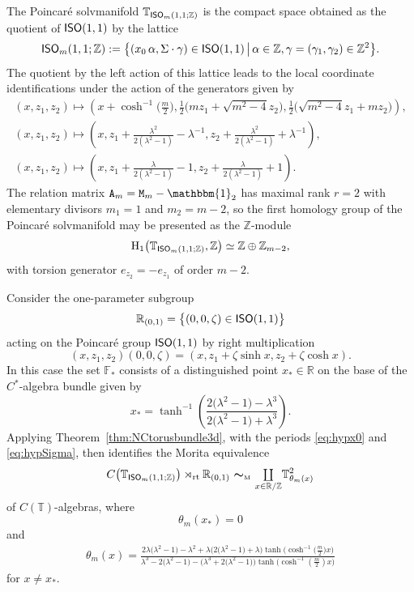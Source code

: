 \documentclass[pdftex]{sigma}
\numberwithin{equation}{section}
\newcommand{\Z}{\zed}
\newcommand{\F}{\mathbb{F}}
\newcommand{\mbf}[1]{{\boldsymbol {#1} }}
\newcommand{\unit}{\mathbbm{1}} 			%
\newcommand{\ISO}{{\sf ISO}}
\newcommand{\rt}{{\rm rt}}
\newcommand{\mcoprod}{\mbox{$\coprod\limits_{x\in\R/\Z}$}}
\newcommand{\R}{\real}
\newcommand{\zed}{{\mathbb Z}} %
\newcommand{\real}{{\mathbb R}} %
\newcommand{\torus}{{\mathbb T}} %
\begin{document}
The Poincar\'e
solvmanifold $\torus_{\ISO_m(1,1;\Z)}$ is the compact space
obtained as the quotient of $\ISO(1,1)$ by the lattice
\[
\ISO_m(1,1;\Z) := \big\{(x_0\,\alpha,\Sigma\cdot\gamma)\in\ISO(1,1) \, \big| \,
\alpha\in\Z , \gamma=(\gamma_1,\gamma_2)\in\Z^2\big\} .
\]
The quotient by the left action of this lattice leads to the local
coordinate identifications under the action of the generators given by
\begin{gather*}
(x,z_1,z_2) \longmapsto
\left(x+\cosh^{-1}\big(\tfrac m2\big),\tfrac12\big(mz_1+\sqrt{m^2-4}z_2\big),\tfrac12\big(\sqrt{m^2-4}z_1+mz_2\big) \right) , \\
(x,z_1,z_2) \longmapsto \left(x , z_1+\tfrac{\lambda^2}{2 (\lambda^2-1)}-\lambda^{-1} , z_2+\tfrac{\lambda^2}{2(\lambda^2-1)}+\lambda^{-1}\right) , \nonumber
 \\
(x,z_1,z_2) \longmapsto \left(x, z_1+\tfrac\lambda{2(\lambda^2-1)}-1, z_2+\tfrac\lambda{2(\lambda^2-1)}+1\right).
\end{gather*}
The relation matrix ${\tt A}_m = {\tt M}_m-\unit_2$ has maximal rank $r=2$ with elementary divisors $m_1=1$ and
$m_2=m-2$, so the first homology group of the Poincar\'e solvmanifold may be
presented as the $\Z$-module
\[
{\rm H}_1\big(\torus_{\ISO_m(1,1;\Z)},\Z\big)\simeq\Z\oplus\Z_{m-2} ,
\]
with torsion generator $e_{z_2}=-e_{z_1}$ of order $m-2$.

Consider the one-parameter subgroup
\[
\real_{(0,1)} = \big\{(0,0,\zeta)\in\ISO(1,1)\big\}
\]
acting on the Poincar\'e group $\ISO(1,1)$ by right multiplication
\[
(x,z_1,z_2) (0,0,\zeta) = (x,z_1+\zeta\sinh x,z_2+\zeta\cosh x) .
\]
In this case the set $\F_*$ consists of a distinguished point $x_*\in\R$ on the base of the
$C^*$-algebra bundle given by
\[
x_*=\tanh^{-1}\left(\frac{2 \big(\lambda^2-1\big)-\lambda^3}{2 \big(\lambda^2-1\big)+\lambda^3}\right).
\]
Applying
Theorem~\ref{thm:NCtorusbundle3d}, with the periods
\eqref{eq:hypx0} and \eqref{eq:hypSigma}, then identifies the
Morita equivalence
\[
C\big(\torus_{\ISO_m(1,1;\Z)}\big)\rtimes_\rt\real_{(0,1)} \ \mbf\sim_{\text{\tiny M}} \
\mcoprod \torus_{\theta_m(x)}^2
\]
of $C(\torus)$-algebras, where
\[
\theta_m(x_*)=0
\]
and
\begin{gather}\label{eq:thetamxhyp}
\theta_m(x) =
\frac{2 \lambda \big(\lambda^2-1\big)-\lambda^2+\lambda
 \big(2\big(\lambda^2-1\big)+\lambda\big)\tanh\big(\cosh^{-1}\big(\frac
 m2\big) x\big)}{\lambda^3-2 \big(\lambda^2-1\big) - \big(\lambda^3+2 \big(\lambda^2-1\big)\big)\tanh\big(\cosh^{-1}(\frac
 m2) x\big)}
\end{gather}
for $x\neq x_*$.
\end{document}
